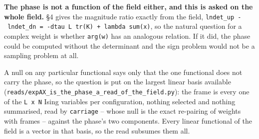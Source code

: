 \documentclass[10pt,letterpaper,twocolumn]{article}
\begin{document}
\textbf{The phase is not a function of the field either, and this is asked on the whole field.} §4 gives
the magnitude ratio exactly from the field,
\texttt{ln\textbar{}\allowbreak{}det\_\allowbreak{}up\textbar{}\allowbreak{}\ -{}\allowbreak{}\ ln\textbar{}\allowbreak{}det\_\allowbreak{}dn\textbar{}\allowbreak{}\ =\allowbreak{}\ -{}\allowbreak{}dtau\ L\ tr(\allowbreak{}K)\allowbreak{}\ +\allowbreak{}\ lambda\ sum(\allowbreak{}x)\allowbreak{}}, so the natural question for a complex
weight is whether \texttt{arg(\allowbreak{}w)\allowbreak{}} has an analogous relation. If it did, the phase could be computed
without the determinant and the sign problem would not be a sampling problem at all.

A null on any particular functional says only that the one functional does not carry the phase, so
the question is put on the largest linear basis available
(\texttt{reads/\allowbreak{}expAX\_\allowbreak{}is\_\allowbreak{}the\_\allowbreak{}phase\_\allowbreak{}a\_\allowbreak{}read\_\allowbreak{}of\_\allowbreak{}the\_\allowbreak{}field.\allowbreak{}py}): the frame is
every one of the \texttt{L\ x\ N} Ising variables per configuration, nothing selected and nothing
summarised, read by \texttt{carriage} -- whose null is the exact re-pairing of weights with frames --
against the phase's two components. Every linear functional of the field is a vector in that
basis, so the read subsumes them all.

\end{document}
